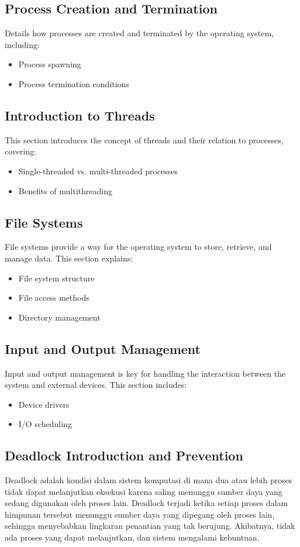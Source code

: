 \documentclass[12pt]{article}
\begin{document}
\subsection{Process Creation and Termination}
Details how processes are created and terminated by the operating system, including:
\begin{itemize}
    \item Process spawning
    \item Process termination conditions
\end{itemize}

\subsection{Introduction to Threads}
This section introduces the concept of threads and their relation to processes, covering:
\begin{itemize}
    \item Single-threaded vs. multi-threaded processes
    \item Benefits of multithreading
\end{itemize}

\subsection{File Systems}
File systems provide a way for the operating system to store, retrieve, and manage data. This section explains:
\begin{itemize}
    \item File system structure
    \item File access methods
    \item Directory management
\end{itemize}

\subsection{Input and Output Management}
Input and output management is key for handling the interaction between the system and external devices. This section includes:
\begin{itemize}
    \item Device drivers
    \item I/O scheduling
\end{itemize}

\subsection{Deadlock Introduction and Prevention}
Deadlock adalah kondisi dalam sistem komputasi di mana dua atau lebih proses tidak dapat melanjutkan eksekusi karena saling menunggu sumber daya yang sedang digunakan oleh proses lain. Deadlock terjadi ketika setiap proses dalam himpunan tersebut menunggu sumber daya yang dipegang oleh proses lain, sehingga menyebabkan lingkaran penantian yang tak berujung. Akibatnya, tidak ada proses yang dapat melanjutkan, dan sistem mengalami kebuntuan.
\end{document}
